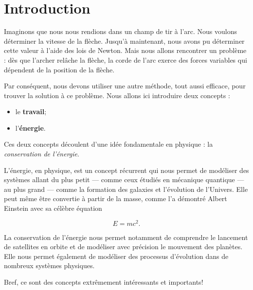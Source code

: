 \documentclass[11pt,openany]{book}
\begin{document}


\chapter*{Introduction}

Imaginons que nous nous rendions dans un champ de tir à l’arc. Nous voulons déterminer la vitesse de la flèche. Jusqu’à maintenant, nous avons pu déterminer cette valeur à l’aide des lois de Newton. Mais nous allons rencontrer un problème : dès que l’archer relâche la flèche, la corde de l’arc exerce des forces variables qui dépendent de la position de la flèche.

Par conséquent, nous devons utiliser une autre méthode, tout aussi efficace, pour trouver la solution à ce problème. Nous allons ici introduire deux concepts :

\begin{itemize}


\item le \textbf{travail};

\item l'\textbf{énergie}.

\end{itemize}

Ces deux concepts découlent d’une idée fondamentale en physique : la \textit{conservation de l’énergie}.

L’énergie, en physique, est un concept récurrent qui nous permet de modéliser des systèmes allant du plus petit — comme ceux étudiés en mécanique quantique — au plus grand — comme la formation des galaxies et l’évolution de l’Univers. Elle peut même être convertie à partir de la masse, comme l’a démontré Albert Einstein avec sa célèbre équation

$$
E = mc^2.
$$

La conservation de l’énergie nous permet notamment de comprendre le lancement de satellites en orbite et de modéliser avec précision le mouvement des planètes. Elle nous permet également de modéliser des processus d’évolution dans de nombreux systèmes physiques.

Bref, ce sont des concepts extrêmement intéressants et importants!

\end{document}
